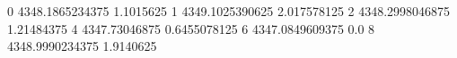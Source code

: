 0 4348.1865234375 1.1015625
1 4349.1025390625 2.017578125
2 4348.2998046875 1.21484375
4 4347.73046875 0.6455078125
6 4347.0849609375 0.0
8 4348.9990234375 1.9140625
